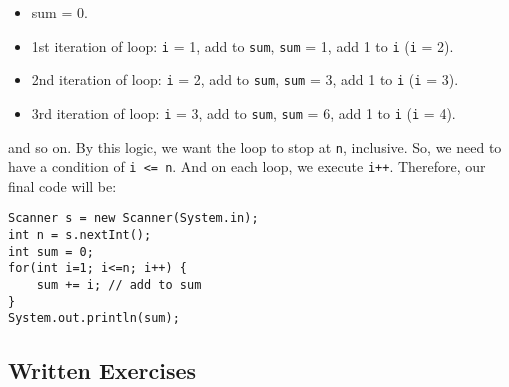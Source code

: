 \begin{itemize}
\item sum = 0.
\item 1st iteration of loop: \verb|i| = 1, add to \verb|sum|, \verb|sum| = 1, add 1 to \verb|i| (\verb|i| = 2).
\item 2nd iteration of loop: \verb|i| = 2, add to \verb|sum|, \verb|sum| = 3, add 1 to \verb|i| (\verb|i| = 3).
\item 3rd iteration of loop: \verb|i| = 3, add to \verb|sum|, \verb|sum| = 6, add 1 to \verb|i| (\verb|i| = 4).
\end{itemize}
and so on. By this logic, we want the loop to stop at \verb|n|, inclusive. So, we need to have a condition of \verb|i <= n|. And on each loop, we execute \verb|i++|. Therefore, our final code will be:
\begin{lstlisting}
Scanner s = new Scanner(System.in);
int n = s.nextInt();
int sum = 0;
for(int i=1; i<=n; i++) {
	sum += i; // add to sum
}
System.out.println(sum);
\end{lstlisting}

\subsection{Written Exercises}

